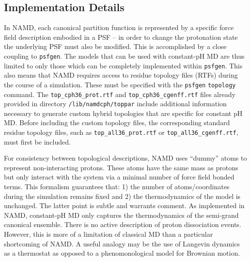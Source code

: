 \subsection{Implementation Details}

In NAMD, each canonical partition function is represented by a specific force
  field description embodied in a PSF -- in order to change the protonation
  state the underlying PSF must also be modified.
This is accomplished by a close coupling to \texttt{psfgen}.
The models that can be used with constant-pH MD are thus limited to only those
  which can be completely implemented within \texttt{psfgen}.
This also means that NAMD requires access to residue topology files (RTFs)
  during the course of a simulation.
These must be specified with the \texttt{psfgen} \texttt{topology} command.
The \texttt{top\_cph36\_prot.rtf} and \texttt{top\_cph36\_cgenff.rtf} files already
provided in directory \texttt{/lib/namdcph/toppar} include additional information
necessary to generate custom hybrid topologies that are specific for constant pH MD.
Before including the custom topology files, the corresponding
standard residue topology files, such as
\texttt{top\_all36\_prot.rtf} or \texttt{top\_all36\_cgenff.rtf},
must first be included.

For consistency between topological descriptions, NAMD uses ``dummy'' atoms to
  represent non-interacting protons.
These atoms have the same mass as protons but only interact with the system
  via a minimal number of force field bonded terms.
This formalism guarantees that:
  1) the number of atoms/coordinates during the simulation remains fixed
  and
  2) the thermodynamics of the model is unchanged.
The latter point is subtle and warrants comment.
As implemented in NAMD, constant-pH MD only captures the thermodynamics of
  the semi-grand canonical ensemble.
There is no active description of proton dissociation events.
However, this is more of a limitation of classical MD than a particular
  shortcoming of NAMD.
A useful analogy may be the use of Langevin dynamics as a thermostat as
  opposed to a phenomonological model for Brownian motion.

\begin{figure}[h]\end{figure}

